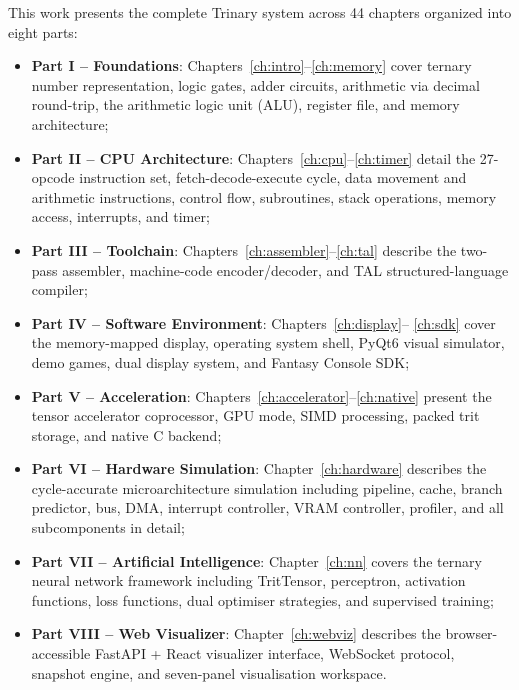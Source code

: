 \documentclass[10pt,a4paper,twoside]{book}
\begin{document}
This work presents the complete Trinary system across 44 chapters organized into eight
parts:
\begin{itemize}
    \item \textbf{Part I -- Foundations}: Chapters~\ref{ch:intro}--\ref{ch:memory}
          cover ternary number representation, logic gates, adder circuits, arithmetic
          via decimal round-trip, the arithmetic logic unit (ALU), register file, and
          memory architecture;
    \item \textbf{Part II -- CPU Architecture}: Chapters~\ref{ch:cpu}--\ref{ch:timer}
          detail the 27-opcode instruction set, fetch-decode-execute cycle, data
          movement and arithmetic instructions, control flow, subroutines, stack
          operations, memory access, interrupts, and timer;
    \item \textbf{Part III -- Toolchain}: Chapters~\ref{ch:assembler}--\ref{ch:tal}
          describe the two-pass assembler, machine-code encoder/decoder, and TAL
          structured-language compiler;
    \item \textbf{Part IV -- Software Environment}: Chapters~\ref{ch:display}--
          \ref{ch:sdk} cover the memory-mapped display, operating system shell, PyQt6
          visual simulator, demo games, dual display system, and Fantasy Console SDK;
    \item \textbf{Part V -- Acceleration}: Chapters~\ref{ch:accelerator}--\ref{ch:native}
          present the tensor accelerator coprocessor, GPU mode, SIMD processing, packed
          trit storage, and native C backend;
    \item \textbf{Part VI -- Hardware Simulation}: Chapter~\ref{ch:hardware} describes
          the cycle-accurate microarchitecture simulation including pipeline, cache,
          branch predictor, bus, DMA, interrupt controller, VRAM controller, profiler,
          and all subcomponents in detail;
    \item \textbf{Part VII -- Artificial Intelligence}: Chapter~\ref{ch:nn} covers
          the ternary neural network framework including TritTensor, perceptron,
          activation functions, loss functions, dual optimiser strategies, and
          supervised training;
    \item \textbf{Part VIII -- Web Visualizer}: Chapter~\ref{ch:webviz} describes
          the browser-accessible FastAPI + React visualizer interface, WebSocket
          protocol, snapshot engine, and seven-panel visualisation workspace.
\end{itemize}
\end{document}
